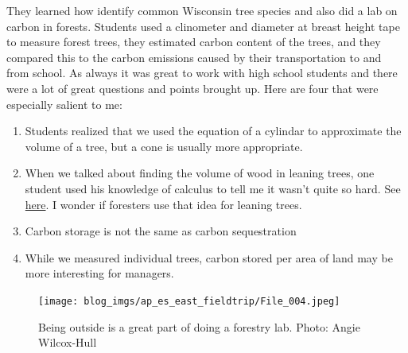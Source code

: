\documentclass{article}
\begin{document}
They learned how identify common Wisconsin tree species and also did a
lab on carbon in forests.  Students used a clinometer and diameter at
breast height tape to measure forest trees, they estimated carbon
content of the trees, and they compared this to the carbon emissions
caused by their transportation to and from school.  As always it was
great to work with high school students and there were a lot of great
questions and points brought up.  Here are four that were especially
salient to me:
\begin{enumerate}
\item Students realized that we used the equation of a cylindar to
approximate the volume of a tree, but a cone is usually more
appropriate.
\item When we talked about finding the volume of wood in leaning trees,
one student used his knowledge of calculus to tell me it wasn't
quite so hard. See \href{https://math.stackexchange.com/a/431255/486030}{here}.  I wonder if foresters use that idea for
leaning trees.
\item Carbon storage is not the same as carbon sequestration
\item While we measured individual trees, carbon stored per area of land
may be more interesting for managers.
\end{enumerate}

\begin{figure}[htbp]
\centering
\texttt{[image: blog\_imgs/ap\_es\_east\_fieldtrip/File\_004.jpeg]}
\caption{Being outside is a great part of doing a forestry lab.  Photo: Angie Wilcox-Hull}
\end{figure}
\end{document}
